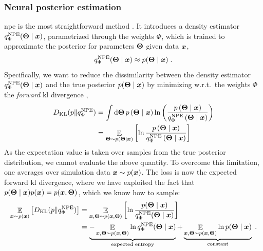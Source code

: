 \subsubsection{Neural posterior estimation}

\Gls*{npe} is the most straightforward method \cite{Papamakarios:2016ctj, Greenberg:2019aa}. It introduces a density estimator $q^\text{NPE}_\Phi(\bm{\Theta}\mid\bm{x})$, parametrized through the weights $\Phi$, which is trained to approximate the posterior for parameters $\bm{\Theta}$ given data $\bm{x}$,
%
\begin{equation}
    q^\text{NPE}_\Phi(\bm{\Theta} \mid \bm{x}) \approx p(\bm{\Theta}\mid\bm{x})\;.
\end{equation}
%
Specifically, we want to reduce the dissimilarity between the density estimator $q^\text{NPE}_\Phi(\bm{\Theta} \mid \bm{x})$ and the true posterior $p(\bm{\Theta}\mid\bm{x})$ by minimizing w.r.t.~the weights $\Phi$ the \emph{forward} \gls*{kl} divergence \cite{Kullback:1951zyt},
%
\begin{align} \label{eq:fkl}
	D_{\mathrm{KL}}(p \| q^\text{NPE}_\Phi) &= \int \dd \bm{\Theta} \,p\left(\bm{\Theta} \mid \bm{x}\right) \ln \left(\frac{p\left(\bm{\Theta} \mid \bm{x}\right)}{q^\text{NPE}_\Phi\left(\bm{\Theta} \mid \bm{x}\right)}\right) \\
	& =\mathop{\mathbb{E}}\limits_{\bm{\Theta} \sim p\left(\bm{\Theta} \mid \bm{x}\right)}\left[\ln \frac{p\left(\bm{\Theta} \mid \bm{x}\right)}{q^\text{NPE}_\Phi\left(\bm{\Theta} \mid \bm{x}\right)}\right]
\end{align}
%
As the expectation value is taken over samples from the true posterior distribution, we cannot evaluate the above quantity. To overcome this limitation, one averages over simulation data $\bm{x} \sim p(\bm{x})$. The loss is now the expected forward \gls*{kl} divergence, where we have exploited the fact that $p(\bm{\Theta}\mid \bm{x}) p(\bm{x})=p(\bm{x}, \bm{\Theta})$, which we know how to sample:
%
\begin{align}
	\mathop{\mathbb{E}}\limits_{\bm{x} \sim p(\bm{x})}\left[D_{\mathrm{KL}}(p \| q^\text{NPE}_\Phi)\right] & =\mathop{\mathbb{E}}\limits_{\bm{x}, \bm{\Theta} \sim p(\bm{x}, \bm{\Theta})}\left[\ln \frac{p(\bm{\Theta} \mid \bm{x})}{q^\text{NPE}_\Phi(\bm{\Theta} \mid \bm{x})}\right] \\
	& =\underbrace{-\mathop{\mathbb{E}}\limits_{\bm{x}, \bm{\Theta} \sim p(\bm{x}, \bm{\Theta})} \ln q^\text{NPE}_\Phi(\bm{\Theta} \mid \bm{x})}_{\text{expected entropy}}+\underbrace{\mathop{\mathbb{E}}\limits_{\bm{x}, \bm{\Theta} \sim p(\bm{x}, \bm{\Theta})} \ln p(\bm{\Theta} \mid \bm{x})}_{\text {constant}} \;.
\end{align}

